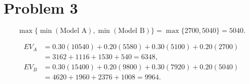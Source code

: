\section*{Problem 3}
\[\max\{\min(\text{Model A}), \min(\text{Model B})\}
		= \max\{2700, 5040\}
		= 5040.\]

\[\begin{aligned}
		EV_A &= 0.30(10540)+0.20(5580)+0.30(5100)+0.20(2700)\\
		&= 3162+1116+1530+540=6348,\\
		EV_B &= 0.30(15400)+0.20(9800)+0.30(7920)+0.20(5040)\\
		&= 4620+1960+2376+1008=9964.
		\end{aligned}\]


